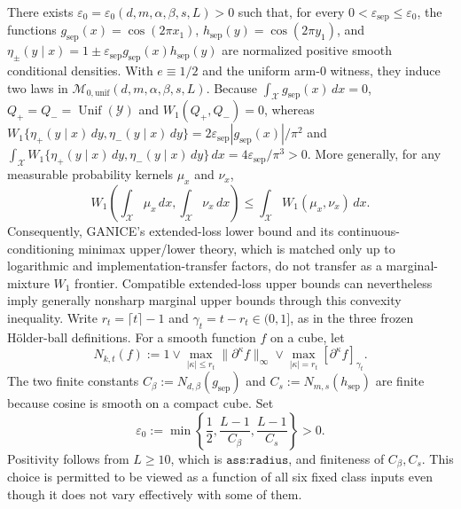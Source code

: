 There exists \(\varepsilon_0=\varepsilon_0(d,m,\alpha,\beta,s,L)>0\) such that, for every \(0<\varepsilon_{\mathrm{sep}}\le\varepsilon_0\), the functions \(g_{\mathrm{sep}}(x)=\cos(2\pi x_1)\), \(h_{\mathrm{sep}}(y)=\cos(2\pi y_1)\), and \(\eta_{\pm}(y\mid x)=1\pm\varepsilon_{\mathrm{sep}}g_{\mathrm{sep}}(x)h_{\mathrm{sep}}(y)\) are normalized positive smooth conditional densities. With \(e\equiv1/2\) and the uniform arm-\(0\) witness, they induce two laws in \(\mathcal M_{0,\mathrm{unif}}(d,m,\alpha,\beta,s,L)\). Because \(\int_{\mathcal X}g_{\mathrm{sep}}(x)\,dx=0\), \(Q_+=Q_-=\operatorname{Unif}(\mathcal Y)\) and \(W_1(Q_+,Q_-)=0\), whereas \(W_1\{\eta_+(y\mid x)\,dy,\eta_-(y\mid x)\,dy\}=2\varepsilon_{\mathrm{sep}}|g_{\mathrm{sep}}(x)|/\pi^2\) and \(\int_{\mathcal X}W_1\{\eta_+(y\mid x)\,dy,\eta_-(y\mid x)\,dy\}\,dx=4\varepsilon_{\mathrm{sep}}/\pi^3>0\). More generally, for any measurable probability kernels \(\mu_x\) and \(\nu_x\),
\[
W_1\!\left(\int_{\mathcal X}\mu_x\,dx,\int_{\mathcal X}\nu_x\,dx\right)\le\int_{\mathcal X}W_1(\mu_x,\nu_x)\,dx.
\]
Consequently, GANICE's extended-loss lower bound and its continuous-conditioning minimax upper/lower theory, which is matched only up to logarithmic and implementation-transfer factors, do not transfer as a marginal-mixture \(W_1\) frontier. Compatible extended-loss upper bounds can nevertheless imply generally nonsharp marginal upper bounds through this convexity inequality.
Write \(r_t=\lceil t\rceil-1\) and \(\gamma_t=t-r_t\in(0,1]\), as in the three frozen H\"older-ball definitions.  For a smooth function \(f\) on a cube, let
\[
N_{k,t}(f):=1\vee\max_{|\kappa|\le r_t}\|\partial^\kappa f\|_\infty
 \vee\max_{|\kappa|=r_t}[\partial^\kappa f]_{\gamma_t}.
\]
The two finite constants \(C_\beta:=N_{d,\beta}(g_{\mathrm{sep}})\) and \(C_s:=N_{m,s}(h_{\mathrm{sep}})\) are finite because cosine is smooth on a compact cube.  Set
\[
\varepsilon_0:=\min\left\{\frac12,\frac{L-1}{C_\beta},\frac{L-1}{C_s}\right\}>0.
\]
Positivity follows from \(L\ge10\), which is \(\texttt{ass:radius}\), and finiteness of \(C_\beta,C_s\).  This choice is permitted to be viewed as a function of all six fixed class inputs even though it does not vary effectively with some of them.

